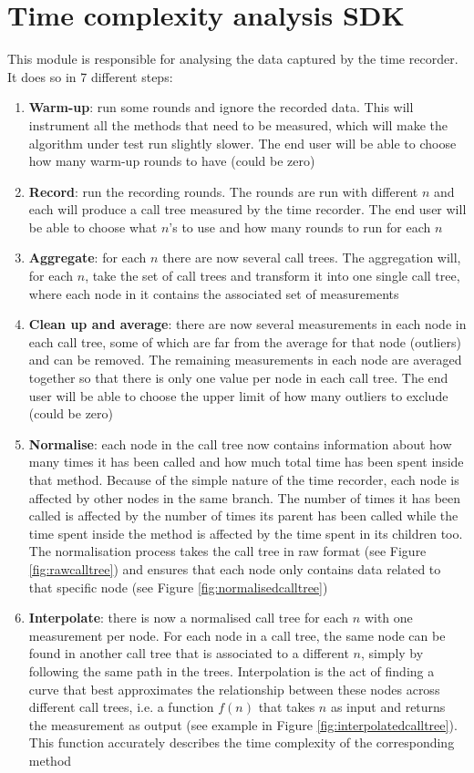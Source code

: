 \section{Time complexity analysis SDK}
This module is responsible for analysing the data captured by the time recorder. It does so in 7 different steps:
\begin{enumerate}
  \item \textbf{Warm-up}: run some rounds and ignore the recorded data. This will instrument all the methods that need to be measured, which will make the algorithm under test run slightly slower. The end user will be able to choose how many warm-up rounds to have (could be zero)
  \item \textbf{Record}: run the recording rounds. The rounds are run with different $n$ and each will produce a call tree measured by the time recorder. The end user will be able to choose what $n$'s to use and how many rounds to run for each $n$
  \item \textbf{Aggregate}: for each $n$ there are now several call trees. The aggregation will, for each $n$, take the set of call trees and transform it into one single call tree, where each node in it contains the associated set of measurements
  \item \textbf{Clean up and average}: there are now several measurements in each node in each call tree, some of which are far from the average for that node (outliers) and can be removed. The remaining measurements in each node are averaged together so that there is only one value per node in each call tree. The end user will be able to choose the upper limit of how many outliers to exclude (could be zero)
  \item \textbf{Normalise}: each node in the call tree now contains information about how many times it has been called and how much total time has been spent inside that method. Because of the simple nature of the time recorder, each node is affected by other nodes in the same branch. The number of times it has been called is affected by the number of times its parent has been called while the time spent inside the method is affected by the time spent in its children too. The normalisation process takes the call tree in raw format (see Figure \ref{fig:rawcalltree}) and ensures that each node only contains data related to that specific node (see Figure \ref{fig:normalisedcalltree})
  \item \textbf{Interpolate}: there is now a normalised call tree for each $n$ with one measurement per node. For each node in a call tree, the same node can be found in another call tree that is associated to a different $n$, simply by following the same path in the trees. Interpolation is the act of finding a curve that best approximates the relationship between these nodes across different call trees, i.e. a function $f(n)$ that takes $n$ as input and returns the measurement as output (see example in Figure \ref{fig:interpolatedcalltree}). This function accurately describes the time complexity of the corresponding method

\end{enumerate}
